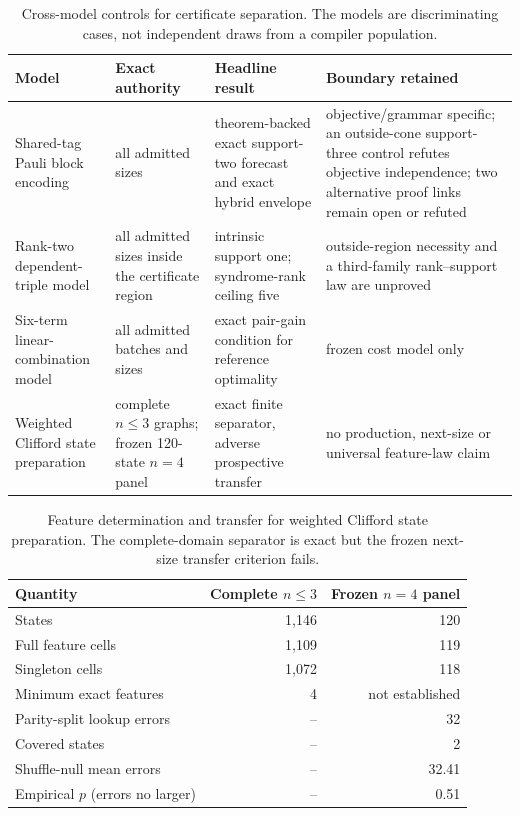 \begin{table}[t]
\centering
\caption{Cross-model controls for certificate separation.  The models are discriminating cases, not independent draws from a compiler population.}
\label{tab:cross-model}
\begin{tabularx}{\textwidth}{@{}>{\raggedright\arraybackslash}p{}>{\raggedright\arraybackslash}p{}>{\raggedright\arraybackslash}p{}>{\raggedright\arraybackslash}X@{}}
\toprule
Model & Exact authority & Headline result & Boundary retained \\
\midrule
Shared-tag Pauli block encoding & all admitted sizes & theorem-backed exact support-two forecast and exact hybrid envelope & objective/grammar specific; an outside-cone support-three control refutes objective independence; two alternative proof links remain open or refuted \\
Rank-two dependent-triple model & all admitted sizes inside the certificate region & intrinsic support one; syndrome-rank ceiling five & outside-region necessity and a third-family rank--support law are unproved \\
Six-term linear-combination model & all admitted batches and sizes & exact pair-gain condition for reference optimality & frozen cost model only \\
Weighted Clifford state preparation & complete $n\le3$ graphs; frozen 120-state $n=4$ panel & exact finite separator, adverse prospective transfer & no production, next-size or universal feature-law claim \\
\bottomrule
\end{tabularx}
\end{table}

\begin{table}[t]
\centering
\footnotesize
\caption{Feature determination and transfer for weighted Clifford state preparation.  The complete-domain separator is exact but the frozen next-size transfer criterion fails.}
\label{tab:feature-transfer}
\begin{tabularx}{\columnwidth}{@{}>{\raggedright\arraybackslash}Xrr@{}}
\toprule
Quantity & Complete $n\le3$ & Frozen $n=4$ panel \\
\midrule
States & 1,146 & 120 \\
Full feature cells & 1,109 & 119 \\
Singleton cells & 1,072 & 118 \\
Minimum exact features & 4 & not established \\
Parity-split lookup errors & -- & 32 \\
Covered states & -- & 2 \\
Shuffle-null mean errors & -- & 32.41 \\
Empirical $p$ (errors no larger) & -- & 0.51 \\
\bottomrule
\end{tabularx}
\end{table}
